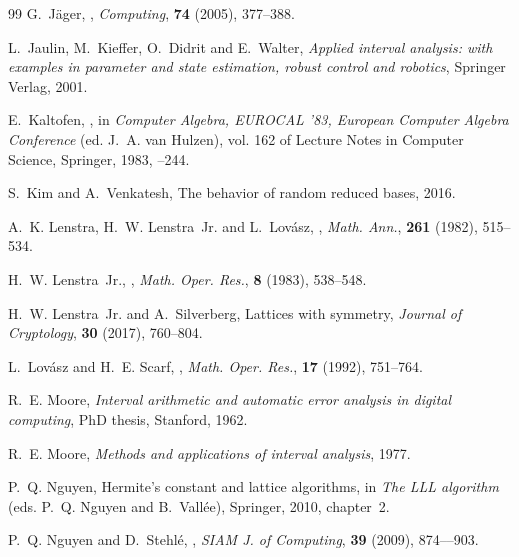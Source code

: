 \documentclass{amsart}
\theoremstyle{definition}
\begin{document}
\begin{thebibliography}{99}
\newblock G.~J{\"a}ger,
,
\newblock \emph{Computing}, \textbf{74} (2005), 377--388.

\newblock L.~Jaulin, M.~Kieffer, O.~Didrit and E.~Walter,
\newblock \emph{Applied interval analysis: with examples in parameter and state
  estimation, robust control and robotics},
\newblock Springer Verlag, 2001.

\newblock E.~Kaltofen,
,
\newblock in \emph{Computer Algebra, {EUROCAL} '83, European Computer Algebra
  Conference} (ed. J.~A. van Hulzen), vol. 162 of Lecture Notes in Computer
  Science,
\newblock Springer, 1983,
--244.

\newblock S.~Kim and A.~Venkatesh,
\newblock The behavior of random reduced bases, 2016.

\newblock A.~K. Lenstra, H.~W. Lenstra~Jr. and L.~Lov{\'a}sz,
,
\newblock \emph{Math. Ann.}, \textbf{261} (1982), 515--534.

\newblock H.~W. Lenstra~Jr.,
,
\newblock \emph{Math. Oper. Res.}, \textbf{8} (1983), 538--548.

\newblock H.~W. Lenstra~Jr. and A.~Silverberg,
\newblock Lattices with symmetry,
\newblock \emph{Journal of Cryptology}, \textbf{30} (2017), 760--804.

\newblock L.~Lov{\'{a}}sz and H.~E. Scarf,
,
\newblock \emph{Math. Oper. Res.}, \textbf{17} (1992), 751--764.

\newblock R.~E. Moore,
\newblock \emph{Interval arithmetic and automatic error analysis in digital
  computing},
\newblock PhD thesis, Stanford, 1962.

\newblock R.~E. Moore,
\newblock \emph{{Methods and applications of interval analysis}}, 1977.

\newblock P.~Q. Nguyen,
\newblock Hermite's constant and lattice algorithms,
\newblock in \emph{The {LLL} algorithm} (eds. P.~Q. Nguyen and B.~Vall\'ee),
\newblock Springer, 2010,
\newblock chapter~2.

\newblock P.~Q. Nguyen and D.~Stehl\'e,
,
\newblock \emph{SIAM J. of Computing}, \textbf{39} (2009), 874–--903.


\end{thebibliography}
\end{document}
